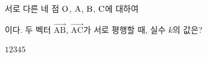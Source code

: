 서로 다른 네 점 $\mathrm{O}$, $\mathrm{A}$, $\mathrm{B}$, $\mathrm{C}$에 대하여 \par\smallskip{}\par\smallskip\noindent 이다. 두 벡터 $\overrightarrow{\mathrm{AB}}$, $\overrightarrow{\mathrm{AC}}$가 서로 평행할 때, 실수 $k$의 값은? 
\begin{choices32}{$1$}{$2$}{$3$}{$4$}{$5$}\end{choices32}
